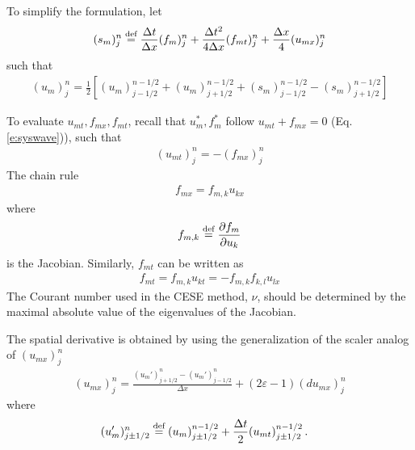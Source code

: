 \documentclass{turgon}
\begin{document}
To simplify the formulation, let
\begin{align}
  (s_m)_j^n \defeq
      \frac{\Delta t}{\Delta x}(f_m)_j^n
    + \frac{\Delta t^2}{4\Delta x}(f_{mt})_j^n
    + \frac{\Delta x}{4}(u_{mx})_j^n
  \label{e:sm}
\end{align}
such that
\begin{align*}
  (u_m)_j^n = \frac{1}{2}\left[
      (u_m)_{j-1/2}^{n-1/2} + (u_m)_{j+1/2}^{n-1/2}
    + (s_m)_{j-1/2}^{n-1/2} - (s_m)_{j+1/2}^{n-1/2}
  \right]
\end{align*}

To evaluate $u_{mt}, f_{mx}, f_{mt}$, recall that $u_m^*, f_m^*$ follow
$u_{mt}+f_{mx}=0$ (Eq.\ref{e:syswave})), such
that
\begin{align}
  (u_{mt})_j^n = -(f_{mx})_j^n \label{e:sysumt}
\end{align}
The chain rule
\begin{align}
  f_{mx} = f_{m,k}u_{kx} \label{e:sysfmk}
\end{align}
where
\begin{align}
  f_{m,k} \defeq \frac{\partial f_m}{\partial u_k} \label{e:sysjacobian}
\end{align}
is the Jacobian.  Similarly, $f_{mt}$ can be written as
\begin{align}
  f_{mt} = f_{m,k}u_{kt} = -f_{m,k}f_{k,l}u_{lx} \label{e:sysfmt}
\end{align}
The Courant number used in the CESE method, $\nu$, should be determined by the
maximal absolute value of the eigenvalues of the Jacobian.

The spatial derivative is obtained by using the generalization of the scaler
analog of
$(u_{mx})_j^n$
\begin{align*}
  (u_{mx})_j^n = \frac{(u_m')_{j+1/2}^n-(u_m')_{j-1/2}^n}{\Delta x}
    + (2\varepsilon-1)(du_{mx})_j^n
\end{align*}
where
\begin{align}
  (u_m')_{j\pm1/2}^n &\defeq
      (u_m)_{j\pm1/2}^{n-1/2}
    + \frac{\Delta t}{2}(u_{mt})_{j\pm1/2}^{n-1/2}\,. \label{e:ump}
\end{align}
\end{document}
